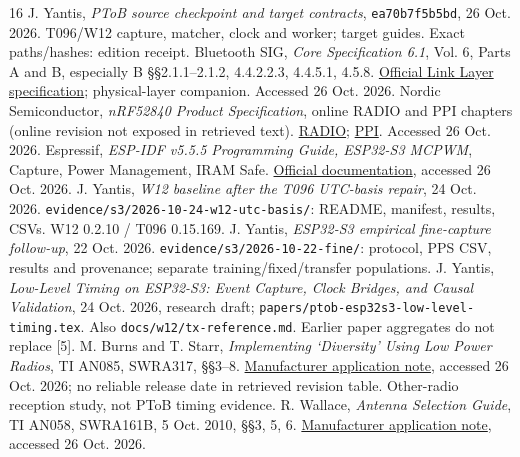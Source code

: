 \documentclass[11pt,letterpaper]{article}
\newcommand{\src}[1]{\nolinkurl{#1}}
\begin{document}
\vspace{-3pt}
\newpage
\begin{thebibliography}{16}\small\setlength{\itemsep}{3pt}\setlength{\parskip}{0pt}
 J. Yantis, \textit{PToB source checkpoint and target contracts}, \src{ea70b7f5b5bd}, 26 Oct. 2026. T096/W12 capture, matcher, clock and worker; target guides. Exact paths/hashes: edition receipt.
 Bluetooth SIG, \textit{Core Specification 6.1}, Vol. 6, Parts A and B, especially B \S\S2.1.1--2.1.2, 4.4.2.2.3, 4.4.5.1, 4.5.8. \href{https://www.bluetooth.com/wp-content/uploads/Files/Specification/HTML/Core-61/out/en/low-energy-controller/link-layer-specification.html}{Official Link Layer specification}; physical-layer companion. Accessed 26 Oct. 2026.
 Nordic Semiconductor, \textit{nRF52840 Product Specification}, online RADIO and PPI chapters (online revision not exposed in retrieved text). \href{https://docs.nordicsemi.com/r/bundle/ps_nrf52840/page/radio.html}{RADIO}; \href{https://docs.nordicsemi.com/r/bundle/ps_nrf52840/page/ppi.html}{PPI}. Accessed 26 Oct. 2026.
 Espressif, \textit{ESP-IDF v5.5.5 Programming Guide, ESP32-S3 MCPWM}, Capture, Power Management, IRAM Safe. \href{https://docs.espressif.com/projects/esp-idf/en/v5.5.5/esp32s3/api-reference/peripherals/mcpwm.html}{Official documentation}, accessed 26 Oct. 2026.
 J. Yantis, \textit{W12 baseline after the T096 UTC-basis repair}, 24 Oct. 2026. \src{evidence/s3/2026-10-24-w12-utc-basis/}: README, manifest, results, CSVs. W12 0.2.10 / T096 0.15.169.
 J. Yantis, \textit{ESP32-S3 empirical fine-capture follow-up}, 22 Oct. 2026. \src{evidence/s3/2026-10-22-fine/}: protocol, PPS CSV, results and provenance; separate training/fixed/transfer populations.
 J. Yantis, \textit{Low-Level Timing on ESP32-S3: Event Capture, Clock Bridges, and Causal Validation}, 24 Oct. 2026, research draft; \src{papers/ptob-esp32s3-low-level-timing.tex}. Also \src{docs/w12/tx-reference.md}. Earlier paper aggregates do not replace [5].
 M. Burns and T. Starr, \textit{Implementing `Diversity' Using Low Power Radios}, TI AN085, SWRA317, \S\S3--8. \href{https://www.ti.com/lit/pdf/swra317}{Manufacturer application note}, accessed 26 Oct. 2026; no reliable release date in retrieved revision table. Other-radio reception study, not PToB timing evidence.
 R. Wallace, \textit{Antenna Selection Guide}, TI AN058, SWRA161B, 5 Oct. 2010, \S\S3, 5, 6. \href{https://www.ti.com/lit/an/swra161b/swra161b.pdf}{Manufacturer application note}, accessed 26 Oct. 2026.

\end{thebibliography}
\end{document}
